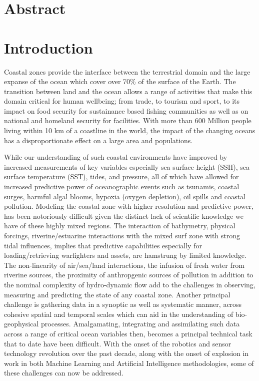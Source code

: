 \section*{Abstract}


\section*{Introduction}

Coastal zones provide the interface between the terrestrial domain and
the large expanse of the ocean which cover over 70\% of the surface of
the Earth. The transition between land and the ocean allows a range of
activities that make this domain critical for human wellbeing; from
trade, to tourism and sport, to its impact on food security for
sustainance based fishing communities as well as on national and
homeland security for facilities. With more than 600 Million people
living within 10 km of a coastline in the world, the impact of the
changing oceans has a disproportionate effect on a large area and
populations. 

While our understanding of such coastal environments have improved by
increased measurements of key variables especially sea surface height
(SSH), sea surface temperature (SST), tides, and pressure, all of
which have allowed for increased predictive power of oceanographic
events such as tsunamis, coastal surges, harmful algal blooms, hypoxia
(oxygen depletion), oil spills and coastal pollution. Modeling the
coastal zone with higher resolution and predictive power, has been
notoriously difficult given the distinct lack of scientific knowledge
we have of these highly mixed regions. The interaction of bathymetry,
physical forcings, riverine/estuarine interactions with the mixed surf
zone with strong tidal influences, implies that predictive
capabilities especially for loading/retrieving warfighters and assets,
are hamstrung by limited knowledge. The non-linearity of air/sea/land
interactions, the infusion of fresh water from riverine sources, the
proximity of anthropgenic sources of pollution in addition to the
nominal complexity of hydro-dynamic flow add to the challenges in
observing, measuring and predicting the state of any coastal
zone. Another principal challenge is gathering data in a synoptic as
well as systematic manner, across cohesive spatial and temporal scales
which can aid in the understanding of bio-geophysical
processes. Amalgamating, integrating and assimilating such data across
a range of critical ocean variables then, becomes a principal
technical task that to date have been difficult. With the onset of the
robotics and sensor technology revolution over the past decade, along
with the onset of explosion in work in both Machine Learning and
Artificial Intelligence methodologies, some of these challenges can
now be addressed.

